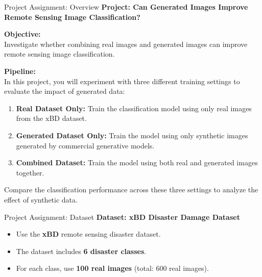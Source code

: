 \begin{refsection}
  \begin{frame}{Project Assignment: Overview}
    \textbf{Project: Can Generated Images Improve Remote Sensing Image Classification?}
  
    \vspace{0.7em}
    \textbf{Objective:}\\
    Investigate whether combining real images and generated images can improve remote sensing image classification.

    \vspace{1em}
    \textbf{Pipeline:}\\
    In this project, you will experiment with three different training settings to evaluate the impact of generated data:
    \begin{enumerate}
      \item \textbf{Real Dataset Only:} Train the classification model using only real images from the xBD dataset.
      \item \textbf{Generated Dataset Only:} Train the model using only synthetic images generated by commercial generative models.
      \item \textbf{Combined Dataset:} Train the model using both real and generated images together.
    \end{enumerate}
    Compare the classification performance across these three settings to analyze the effect of synthetic data.

    \bottomleftrefs
  \end{frame}
\end{refsection}
  
\begin{refsection}
  \begin{frame}{Project Assignment: Dataset}
    \textbf{Dataset: xBD Disaster Damage Dataset}
    \begin{itemize}
      \item Use the \textbf{xBD} remote sensing disaster dataset.
      \item The dataset includes \textbf{6 disaster classes}.
      \item For each class, use \textbf{100 real images} (total: 600 real images).
    \end{itemize}
    \bottomleftrefs
  \end{frame}
  \end{refsection}
  
